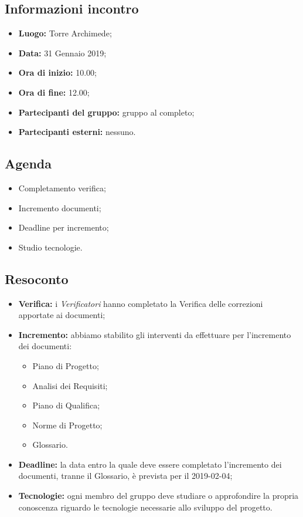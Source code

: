 \subsection{Informazioni incontro}
\begin{itemize}
	\item { \textbf{Luogo:} Torre Archimede};
	\item { \textbf{Data:} 31 Gennaio 2019};
	\item { \textbf{Ora di inizio:} 10.00};
	\item { \textbf{Ora di fine:} 12.00};
	\item { \textbf{Partecipanti del gruppo:} gruppo al completo};
	\item { \textbf{Partecipanti esterni:} nessuno}.
\end{itemize}


\subsection{Agenda}
\begin{itemize}
	\item {Completamento verifica;}
	\item {Incremento documenti;}
	\item {Deadline per incremento;}
	\item {Studio tecnologie.}
\end{itemize}

\subsection{Resoconto}
\begin{itemize}
	\item { \textbf{Verifica:} i \emph{Verificatori} hanno completato la Verifica delle correzioni apportate ai documenti;}
	\item{ \textbf{Incremento:} abbiamo stabilito gli interventi da effettuare per l'incremento dei documenti:
		\begin{itemize}
			\item Piano di Progetto;
			\item Analisi dei Requisiti;
			\item Piano di Qualifica;
			\item Norme di Progetto;
			\item Glossario.
		\end{itemize}}	
	\item { \textbf{Deadline:} la data entro la quale deve essere completato l'incremento dei documenti, tranne il Glossario, è prevista per il 2019-02-04;}
	\item { \textbf{Tecnologie:} ogni membro del gruppo deve studiare o approfondire la propria conoscenza riguardo le tecnologie necessarie allo sviluppo del progetto.}
\end{itemize}

